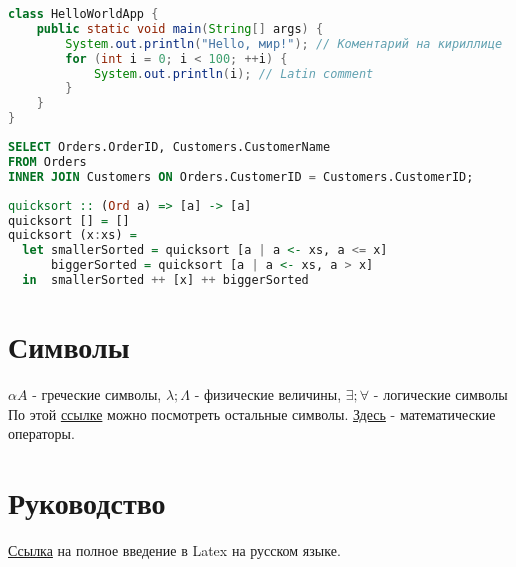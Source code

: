 \begin{lstlisting}[language=Java, caption=Кириллица в листинге не имеет подсветки]
class HelloWorldApp {
    public static void main(String[] args) {
        System.out.println("Hello, мир!"); // Коментарий на кириллице
        for (int i = 0; i < 100; ++i) {
            System.out.println(i); // Latin comment
        }
    }
}
\end{lstlisting}

\begin{lstlisting}[language=SQL, caption=Пример на SQL]
SELECT Orders.OrderID, Customers.CustomerName
FROM Orders
INNER JOIN Customers ON Orders.CustomerID = Customers.CustomerID;
\end{lstlisting}

\begin{lstlisting}[language=haskell, caption=Пример на Haskell]
quicksort :: (Ord a) => [a] -> [a]
quicksort [] = []
quicksort (x:xs) =
  let smallerSorted = quicksort [a | a <- xs, a <= x]
      biggerSorted = quicksort [a | a <- xs, a > x]
  in  smallerSorted ++ [x] ++ biggerSorted
\end{lstlisting}








\section{Символы}
$\alpha A$ - греческие символы,  $ \lambda; \Lambda$ - физические величины, $\exists; \forall$ - логические символы\\
По этой   \href{https://www.overleaf.com/learn/latex/List_of_Greek_letters_and_math_symbols}{ссылке} можно посмотреть остальные символы. \href{https://www.overleaf.com/learn/latex/Operators}{Здесь} - математические операторы.



\section{Руководство}
\href{https://www.texlive.info/CTAN/info/lshort/russian/lshortru.pdf}{Ссылка} на полное введение в Latex на русском языке.


\newpage
